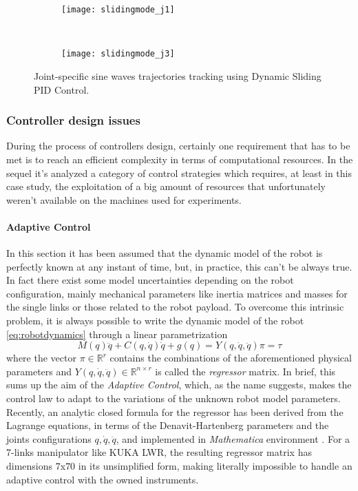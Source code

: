 \begin{figure}[H]
	\centering
	\begin{subfigure}[t]{\textwidth}
		\texttt{[image: slidingmode\_j1]}
	\end{subfigure}
	\\
	\begin{subfigure}[t]{\textwidth}
		\texttt{[image: slidingmode\_j3]}
	\end{subfigure}
	\caption{Joint-specific sine waves trajectories tracking using Dynamic Sliding PID Control.}
\end{figure}

\subsubsection{Controller design issues}
During the process of controllers design, certainly one requirement that has to be met is to reach an efficient complexity in terms of computational resources. In the sequel it's analyzed a category of control strategies which requires, at least in this case study, the exploitation of a big amount of resources that unfortunately weren't available on the machines used for experiments.

\paragraph{Adaptive Control}
In this section it has been assumed that the dynamic model of the robot is perfectly known at any instant of time, but, in practice, this can't be always true. In fact there exist some model uncertainties depending on the robot configuration, mainly mechanical parameters like inertia matrices and masses for the single links or those related to the robot payload. To overcome this intrinsic problem, it is always possible to write the dynamic model of the robot \eqref{eq:robotdynamics} through a linear parametrization
\begin{equation}
M(q)\ddot{q} + C(q,\dot{q})\dot{q} + g(q) = Y(q,\dot{q},\ddot{q})\pi = \tau
\end{equation}
where the vector $\pi\in\mathbb{R}^r$ contains the combinations of the aforementioned physical parameters and $Y(q,\dot{q},\ddot{q})\in\mathbb{R}^{n\times r}$ is called the \textit{regressor} matrix. In brief, this sums up the aim of the \textit{Adaptive Control}, which, as the name suggests, makes the control law to adapt to the variations of the unknown robot model parameters. Recently, an analytic closed formula for the regressor has been derived from the Lagrange equations, in terms of the Denavit-Hartenberg parameters and the joints configurations  $q,\dot{q},\ddot{q}$, and implemented in \textit{Mathematica} environment \cite{gabiccini09}. For a 7-links manipulator like KUKA LWR, the resulting regressor matrix has dimensions $7$x$70$ in its unsimplified form, making literally impossible to handle an adaptive control with the owned instruments.

